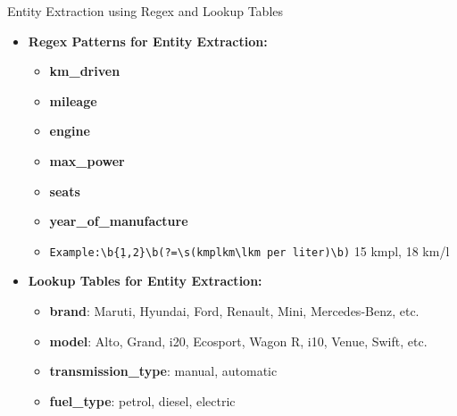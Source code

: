 \documentclass{beamer}
\begin{document}
	
\begin{frame}{Entity Extraction using Regex and Lookup Tables}
	
	\begin{itemize}
		\item \textbf{Regex Patterns for Entity Extraction:}
		\begin{itemize}
			\item \textbf{km\_driven}
			\item \textbf{mileage} 
			\item \textbf{engine} 
			\item \textbf{max\_power} 
			\item \textbf{seats} 
			\item \textbf{year\_of\_manufacture}
			\item \texttt{Example:\textbackslash b\d\{1,2\}\textbackslash b(?=\textbackslash s\*(kmpl\textbar km\textbackslash l\textbar km\ per\ liter)\textbackslash b)\newline} 
			15 kmpl, 18 km/l
		\end{itemize}
		
		\item \textbf{Lookup Tables for Entity Extraction:}
		\begin{itemize}
			\item \textbf{brand}: Maruti, Hyundai, Ford, Renault, Mini, Mercedes-Benz, etc.
			\item \textbf{model}: Alto, Grand, i20, Ecosport, Wagon R, i10, Venue, Swift, etc.
			\item \textbf{transmission\_type}: manual, automatic
			\item \textbf{fuel\_type}: petrol, diesel, electric
		\end{itemize}
	\end{itemize}
	
\end{frame}
\end{document}
